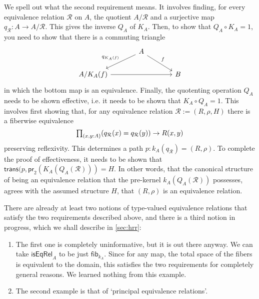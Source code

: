 \documentclass[reqno]{amsart}
\begin{document}
We spell out what the second requirement means. It involves finding, for every equivalence relation $\mathcal{R}$ on $A$, the quotient $A/\mathcal{R}$ and a surjective map $q_{\mathcal{R}} : A\to A/\mathcal{R}$. This gives the inverse $Q_A$ of $K_A$. Then, to show that $Q_A\circ K_A=1$, you need to show that there is a commuting triangle
\begin{equation*}
\begin{tikzcd}[column sep=large]
& A \arrow[dl,swap,"q_{K_A(f)}"] \arrow[dr,"f"] \\
A/K_A(f) \arrow[rr] & & B
\end{tikzcd}
\end{equation*}
in which the bottom map is an equivalence. Finally, the quotenting operation $Q_A$ needs to be shown effective, i.e. it needs to be shown that $K_A\circ Q_A =1$. This involves first showing that, for any equivalence relation $\mathcal{R}:=(R,\rho,H)$ there is a fiberwise equivalence
\begin{equation*}
\prd{x,y:A} (q_{\mathcal{R}}(x)=q_{\mathcal{R}}(y)) \to{} R(x,y)
\end{equation*}
preserving reflexivity. This determines a path $p : k_A(q_{\mathcal{R}})=(R,\rho)$. To complete the proof of effectiveness, it needs to be shown that $\mathsf{trans}(p,\mathsf{pr}_2(K_A(Q_A(\mathcal{R})))= H$. In other words, that the canonical structure of being an equivalence relation that the pre-kernel $k_A(Q_A(\mathcal{R}))$ possesses, agrees with the assumed structure $H$, that $(R,\rho)$ is an equivalence relation.

There are already at least two notions of type-valued equivalence relations that satisfy the two requirements described above, and there is a third notion in progress, which we shall describe in \autoref{sec:hrr}:
\begin{enumerate}
\item The first one is completely uninformative, but it is out there anyway. We can take $\mathsf{isEqRel}_A$ to be just $\mathsf{fib}_{k_A}$. Since for any map, the total space of the fibers is equivalent to the domain, this satisfies the two requirements for completely general reasons. We learned nothing from this example.
\item The second example is that of `principal equivalence relations'. 
\end{enumerate}
\end{document}
